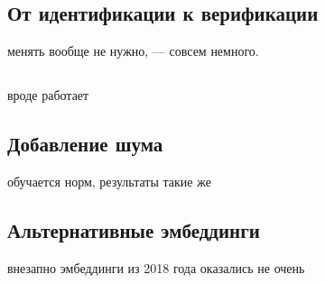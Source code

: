 \subsection{От идентификации к верификации}
\enquirer{} менять вообще не нужно, \guesser{} --- совсем немного.

\subsection{\cbenquirer}
вроде работает

\subsection{Добавление шума}
обучается норм, результаты такие же

\subsection{Альтернативные эмбеддинги}\label{ssec:cpc}
внезапно эмбеддинги из 2018 года оказались не очень
